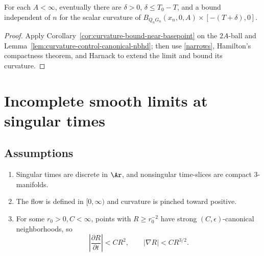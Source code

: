 \begin{claim}
\label{claim:uniform-curvature-bound-extended-interval}
For each $A<\infty$, eventually there are $\delta>0$, $\delta\le T_0-T$, and
a bound independent of $n$ for the scalar curvature of
$B_{Q_nG_n}(x_n,0,A)\times[-(T+\delta),0]$.
\end{claim}
\begin{proof}
\sketch Apply Corollary~\ref{cor:curvature-bound-near-basepoint} on the
$2A$-ball and Lemma~\ref{lem:curvature-control-canonical-nbhd}; then use
\ref{narrows}, Hamilton's compactness theorem, and Harnack to extend the
limit and bound its curvature.\end{proof}

\section{Incomplete smooth limits at singular times}
\subsection{Assumptions}
\begin{definition}
\label{def:standing-assumptions-singular-time}\label{assumptions}
\begin{enumerate}
\item[(a)] Singular times are discrete in $\Ar$, and nonsingular time-slices
are compact $3$-manifolds.
\item[(b)] The flow is defined in $[0,\infty)$ and curvature is pinched
toward positive.
\item[(c)] For some $r_0>0,C<\infty$, points with $R\ge r_0^{-2}$ have
strong $(C,\epsilon)$-canonical neighborhoods, so
$$\left|\frac{\partial R}{\partial t}\right|<CR^2,\qquad
|\nabla R|<CR^{3/2}.$$
\end{enumerate}
\end{definition}

